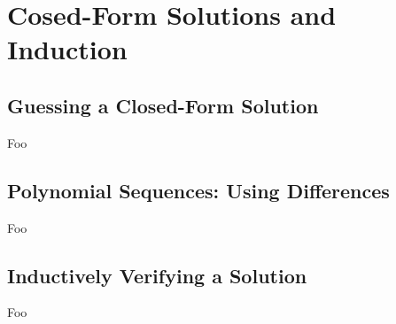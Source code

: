 \section{Cosed-Form Solutions and Induction}

\subsection{Guessing a Closed-Form Solution}

Foo

\subsection{Polynomial Sequences: Using Differences}

Foo

\subsection{Inductively Verifying a Solution}

Foo

